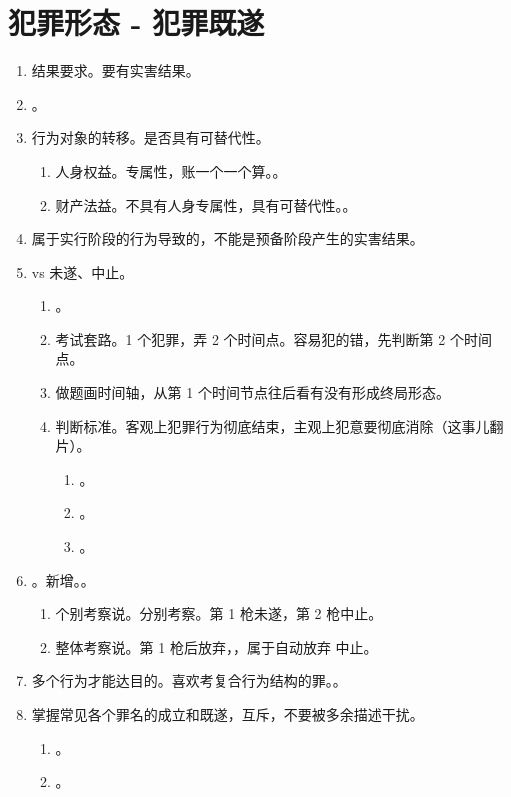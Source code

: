 \section{犯罪形态 - 犯罪既遂}
\begin{enumerate}
  \item 结果要求。要有实害结果。
  \item {}。
  \item 行为对象的转移。是否具有可替代性。
        \begin{enumerate}
          \item 人身权益。专属性，账一个一个算。。
          \item 财产法益。不具有人身专属性，具有可替代性。。
        \end{enumerate}
  \item 属于实行阶段的行为导致的，不能是预备阶段产生的实害结果。
  \item vs 未遂、中止。
        \begin{enumerate}
          \item {}。
          \item 考试套路。1 个犯罪，弄 2 个时间点。容易犯的错，先判断第 2 个时间点。
          \item 做题画时间轴，从第 1 个时间节点往后看有没有形成终局形态。
          \item 判断标准。客观上犯罪行为彻底结束，主观上犯意要彻底消除（这事儿翻片）。
                \begin{enumerate}
                  \item {}。
                  \item {}。
                  \item {}。
                \end{enumerate}
        \end{enumerate}
  \item {}。新增。。
        \begin{enumerate}
          \item 个别考察说。分别考察。第 1 枪未遂，第 2 枪中止。
          \item 整体考察说。第 1 枪后放弃，，属于自动放弃 \yjt 中止。
        \end{enumerate}
  \item 多个行为才能达目的。喜欢考复合行为结构的罪。。
  \item 掌握常见各个罪名的成立和既遂，互斥，不要被多余描述干扰。
        \begin{enumerate}
          \item {}。
          \item {}。
        \end{enumerate}
\end{enumerate}
